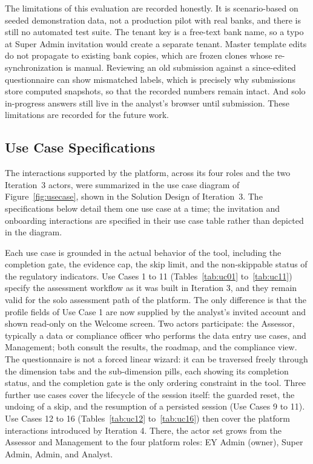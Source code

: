 The limitations of this evaluation are recorded honestly. It is scenario-based on seeded demonstration data, not a production pilot with real banks, and there is still no automated test suite. The tenant key is a free-text bank name, so a typo at Super Admin invitation would create a separate tenant. Master template edits do not propagate to existing bank copies, which are frozen clones whose re-synchronization is manual. Reviewing an old submission against a since-edited questionnaire can show mismatched labels, which is precisely why submissions store computed snapshots, so that the recorded numbers remain intact. And solo in-progress answers still live in the analyst's browser until submission. These limitations are recorded for the future work.

\subsection{Use Case Specifications}
\label{sec:usecases}

The interactions supported by the platform, across its four roles and the two Iteration~3 actors, were summarized in the use case diagram of Figure~\ref{fig:usecase}, shown in the Solution Design of Iteration~3. The specifications below detail them one use case at a time; the invitation and onboarding interactions are specified in their use case table rather than depicted in the diagram.

Each use case is grounded in the actual behavior of the tool, including the completion gate, the evidence cap, the skip limit, and the non-skippable status of the regulatory indicators. Use Cases 1 to 11 (Tables~\ref{tab:uc01} to~\ref{tab:uc11}) specify the assessment workflow as it was built in Iteration 3, and they remain valid for the solo assessment path of the platform. The only difference is that the profile fields of Use Case 1 are now supplied by the analyst's invited account and shown read-only on the Welcome screen. Two actors participate: the Assessor, typically a data or compliance officer who performs the data entry use cases, and Management; both consult the results, the roadmap, and the compliance view. The questionnaire is not a forced linear wizard: it can be traversed freely through the dimension tabs and the sub-dimension pills, each showing its completion status, and the completion gate is the only ordering constraint in the tool. Three further use cases cover the lifecycle of the session itself: the guarded reset, the undoing of a skip, and the resumption of a persisted session (Use Cases 9 to 11). Use Cases 12 to 16 (Tables~\ref{tab:uc12} to~\ref{tab:uc16}) then cover the platform interactions introduced by Iteration 4. There, the actor set grows from the Assessor and Management to the four platform roles: EY Admin (owner), Super Admin, Admin, and Analyst.

